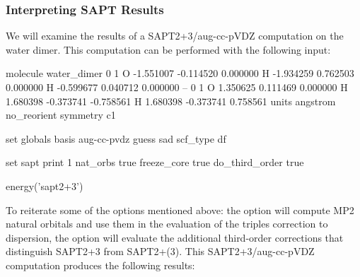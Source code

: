 \subsubsection{Interpreting SAPT Results}

We will examine the results of a SAPT2+3/aug-cc-pVDZ computation on the
water dimer. This computation can be performed with the following 
input:
\begin{Snippet}

molecule water_dimer {
     0 1
     O  -1.551007  -0.114520   0.000000
     H  -1.934259   0.762503   0.000000
     H  -0.599677   0.040712   0.000000
     --
     0 1
     O   1.350625   0.111469   0.000000
     H   1.680398  -0.373741  -0.758561
     H   1.680398  -0.373741   0.758561
     units angstrom
     no_reorient
     symmetry c1
}

set globals {
    basis          aug-cc-pvdz
    guess          sad
    scf_type       df
}

set sapt {
    print          1
    nat_orbs       true
    freeze_core    true
    do_third_order true
}

energy('sapt2+3')

\end{Snippet}
To reiterate some of the options mentioned above: the 
option will compute MP2 natural orbitals and use them in the evaluation of
the triples correction to dispersion, the  option
will evaluate the additional third-order corrections that distinguish SAPT2+3
from SAPT2+(3). This SAPT2+3/aug-cc-pVDZ computation produces the following 
results:
